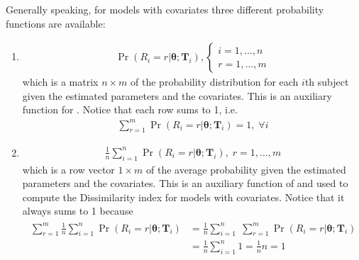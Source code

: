 \documentclass[letterpaper,10pt,english]{sphinxmanual}
\begin{document}
\sphinxAtStartPar
Generally speaking, for models with covariates three different probability functions are available:
\begin{enumerate}
%
\item {} \begin{description}
\begin{equation*}
\begin{split}\Pr(R_i=r|\pmb\theta; \pmb T_i),
\left\{
\begin{array}{l}
i=1,\ldots,n
\\
r=1,\ldots,m
\end{array}
\right.\end{split}
\end{equation*}
\sphinxAtStartPar
which is a matrix \(n \times m\) of the probability distribution for each \(i\)\sphinxhyphen{}th subject
given the estimated parameters and the covariates. This is an auxiliary function
for . Notice that each row sums to 1, i.e.
\begin{equation*}
\begin{split}\sum_{r=1}^m \Pr(R_i=r|\pmb\theta; \pmb T_i) = 1,\; \forall i\end{split}
\end{equation*}
\end{description}

\item {} \begin{description}
\begin{equation*}
\begin{split}\frac{1}{n} \sum_{i=1}^n \Pr(R_i=r|\pmb\theta; \pmb T_i),\; r=1,\ldots,m\end{split}
\end{equation*}
\sphinxAtStartPar
which is a row vector \(1 \times m\) of the average probability given the
estimated parameters and the covariates. This is an auxiliary function
of  and used to compute the Dissimilarity index for models
with covariates. Notice that it always sums to 1 because
\begin{equation*}
\begin{split}\begin{align*}
\sum_{r=1}^m \frac{1}{n} \sum_{i=1}^n \Pr(R_i=r|\pmb\theta; \pmb T_i)
&= \frac{1}{n} \sum_{i=1}^n \; \sum_{r=1}^m \Pr(R_i=r|\pmb\theta; \pmb T_i)
\\&= \frac{1}{n} \sum_{i=1}^n 1 = \frac{1}{n} n = 1
\end{align*}\end{split}
\end{equation*}
\end{description}


\end{enumerate}
\end{document}
